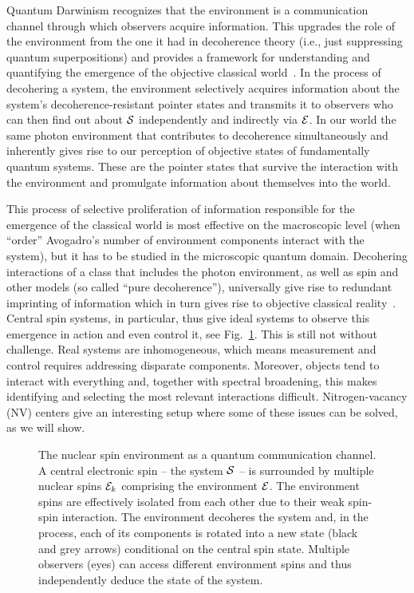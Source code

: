 \documentclass[aps,prl,floatfix,twocolumn,footinbib,superscriptaddress]{revtex4-1}
\begin{document}
Quantum Darwinism recognizes that the environment is a communication channel through which observers acquire information. This upgrades the role of the environment from the one it had in decoherence theory (i.e., just suppressing quantum superpositions) and provides a framework for understanding and quantifying the emergence of the objective classical world~\cite{Ollivier04-1,Ollivier05-1,Blume-Kohout2005,zur09,Zwolak13-1,Zurek14-1,Zwolak14,Pawel15,zwolak16,Zwolak17-1,Gerardo18}. In the process of decohering a system, the environment selectively acquires information about the system's decoherence-resistant pointer states and transmits it to observers who can then find out about $\S$ independently and indirectly via $\E$. In our world the same photon environment that contributes to decoherence simultaneously and inherently gives rise to our perception of objective states of fundamentally quantum systems. These are the pointer states that survive the interaction with the environment and promulgate information about themselves into the world.

This process of selective proliferation of information responsible for the emergence of the classical world is most effective on the macroscopic level (when ``order'' Avogadro's number of environment components interact with the system), but it has to be studied in the microscopic quantum domain. Decohering interactions of a class that includes the photon environment, as well as spin and other models (so called ``pure decoherence''), universally give rise to redundant imprinting of information which in turn gives rise to objective classical reality~\cite{Zwolak14,zwolak16}.  Central spin systems, in particular, thus give ideal systems to observe this emergence in action and even control it, see Fig.~\ref{fig:1}. This is still not without challenge. Real systems are inhomogeneous, which means measurement and control requires addressing disparate components. Moreover, objects tend to interact with everything and, together with spectral broadening, this makes identifying and selecting the most relevant interactions difficult. Nitrogen-vacancy (NV) centers give an interesting setup where some of these issues can be solved, as we will show.  

\begin{figure}
\centerline{}
\caption{The nuclear spin environment as a quantum communication channel. A central electronic spin -- the system $\S$ -- is surrounded by multiple nuclear spins $\E_k$ comprising the environment $\E$. The environment spins are effectively isolated from each other due to their weak spin-spin interaction. The environment decoheres the system and, in the process, each of its components is rotated into a new state (black and grey arrows) conditional on the central spin state. Multiple observers (eyes) can access different environment spins and thus independently deduce the state of the system.}
\label{fig:1}
\end{figure}
\end{document}

